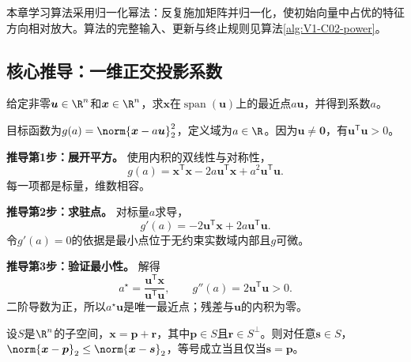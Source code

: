 \label{schema:V1-C02:CH-10}
本章学习算法采用归一化幂法：反复施加矩阵并归一化，使初始向量中占优的特征方向相对放大。算法的完整输入、更新与终止规则见算法\ref{alg:V1-C02-power}。

\subsection*{核心推导：一维正交投影系数}

\begin{derivationgoalbox}\label{schema:V1-C02:CH-11}
给定非零$\boldsymbol{u}\in\R^n$和$\boldsymbol{x}\in\R^n$，求$\boldsymbol{x}$在$\operatorname{span}(\boldsymbol{u})$上的最近点$a\boldsymbol{u}$，并得到系数$a$。
\end{derivationgoalbox}
\begin{derivationprepbox}
目标函数为$g(a)=\norm{\boldsymbol{x}-a\boldsymbol{u}}_2^2$，定义域为$a\in\R$。因为$\boldsymbol{u}\ne\boldsymbol0$，有$\boldsymbol{u}^{\mathsf T}\boldsymbol{u}>0$。
\end{derivationprepbox}
\textbf{推导第1步：展开平方。} 使用内积的双线性与对称性，
\[
g(a)=\boldsymbol{x}^{\mathsf T}\boldsymbol{x}-2a\boldsymbol{u}^{\mathsf T}\boldsymbol{x}
+a^2\boldsymbol{u}^{\mathsf T}\boldsymbol{u}.
\]
每一项都是标量，维数相容。

\textbf{推导第2步：求驻点。} 对标量$a$求导，
\[
g'(a)=-2\boldsymbol{u}^{\mathsf T}\boldsymbol{x}
+2a\boldsymbol{u}^{\mathsf T}\boldsymbol{u}.
\]
令$g'(a)=0$的依据是最小点位于无约束实数域内部且$g$可微。

\textbf{推导第3步：验证最小性。} 解得
\[
a^{\star}=\frac{\boldsymbol{u}^{\mathsf T}\boldsymbol{x}}
{\boldsymbol{u}^{\mathsf T}\boldsymbol{u}},\qquad
g''(a)=2\boldsymbol{u}^{\mathsf T}\boldsymbol{u}>0.
\]
二阶导数为正，所以$a^{\star}\boldsymbol{u}$是唯一最近点；残差与$\boldsymbol{u}$的内积为零。

\begin{theorem}[子空间正交投影的最佳逼近]\label{thm:V1-C02-best-projection}\label{schema:V1-C02:CH-12}
设$S$是$\R^n$的子空间，$\boldsymbol{x}=\boldsymbol{p}+\boldsymbol{r}$，其中$\boldsymbol{p}\in S$且$\boldsymbol{r}\in S^{\perp}$。则对任意$\boldsymbol{s}\in S$，
$\norm{\boldsymbol{x}-\boldsymbol{p}}_2\le\norm{\boldsymbol{x}-\boldsymbol{s}}_2$，等号成立当且仅当$\boldsymbol{s}=\boldsymbol{p}$。
\end{theorem}
